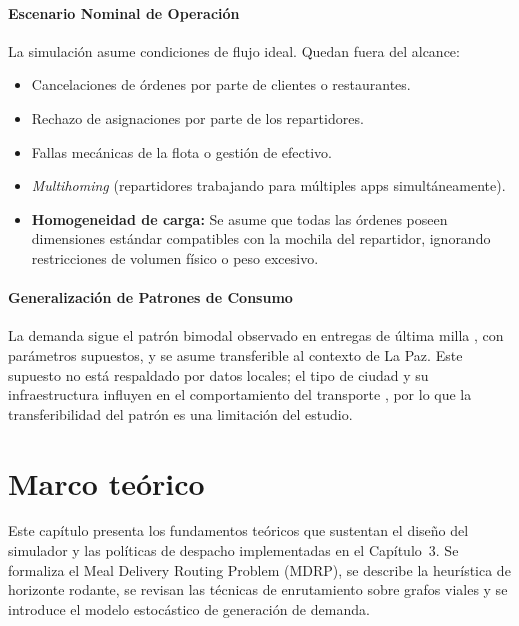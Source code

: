 \documentclass[12pt,letterpaper,oneside]{book}
\begin{document}
\subsubsection{Escenario Nominal de Operación}
La simulación asume condiciones de flujo ideal. Quedan fuera del alcance:
\begin{itemize}
	\item Cancelaciones de órdenes por parte de clientes o restaurantes.
	\item Rechazo de asignaciones por parte de los repartidores.
	\item Fallas mecánicas de la flota o gestión de efectivo.
	\item \textit{Multihoming} (repartidores trabajando para múltiples apps simultáneamente).
	\item \textbf{Homogeneidad de carga:} Se asume que todas las órdenes poseen dimensiones estándar compatibles con
	la mochila del repartidor, ignorando restricciones de volumen físico o peso excesivo.
\end{itemize}

\subsubsection{Generalización de Patrones de Consumo}
La demanda sigue el patrón bimodal observado en entregas de última milla \cite{Wu2023LaDe}, con parámetros
supuestos, y se asume transferible al contexto de La Paz. Este supuesto no está respaldado por datos locales; el tipo de ciudad y su infraestructura influyen en
el comportamiento del transporte \citep{MunozVillamizar2021}, por lo que la transferibilidad del patrón es una
limitación del estudio.
	
	\chapter{Marco teórico}

	Este capítulo presenta los fundamentos teóricos que sustentan el diseño del
	simulador y las políticas de despacho implementadas en el Capítulo~3.  Se
	formaliza el Meal Delivery Routing Problem (MDRP), se describe la heurística
	de horizonte rodante, se revisan las técnicas de enrutamiento sobre grafos
	viales y se introduce el modelo estocástico de generación de demanda.

\end{document}
